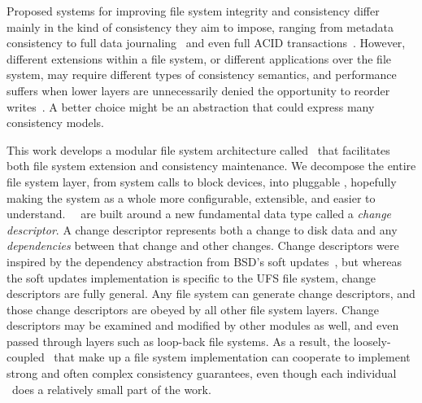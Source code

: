 Proposed systems for improving file system integrity and consistency differ
 mainly in the kind of consistency they aim to impose, ranging from
 metadata consistency to full data journaling~\cite{tweedie98journaling} and even full ACID
 transactions~\cite{gal05transactional,liskov04transactional}.
%
However, different extensions within a file system, or different
 applications over the file system, may require different types of
 consistency semantics, and performance suffers when lower layers are
 unnecessarily denied the opportunity to reorder
 writes~\cite{ganger00soft}.
%
A better choice might be an abstraction that could express many consistency
 models.



This work develops a modular file system architecture called \Kudos\ that
 facilitates both file system extension and consistency
 maintenance.
%
We decompose the entire file system layer, from system calls to block
 devices, into pluggable \modules, hopefully making the system as a whole
 more configurable, extensible, and easier to understand.
%
\Kudos\ \modules\ are built around a new fundamental data type called a
 \emph{change descriptor}.
%
A change descriptor represents both a change to disk data and any
 \emph{dependencies} between that change and other changes.
%
Change descriptors were inspired by the dependency abstraction from BSD's
 soft updates~\cite{ganger00soft}, but whereas the soft updates implementation
 is specific to the UFS file system, change descriptors are fully general.
%
Any file system can generate change descriptors, and those change
 descriptors are obeyed by all other file system layers.
%
Change descriptors may be examined and modified by other modules
 as well, and even passed through layers such as loop-back file systems.
%
As a result, the loosely-coupled \modules\ that make up a file system
 implementation can cooperate to implement strong and often complex
 consistency guarantees, even though each individual \module\ does a
 relatively small part of the work.



